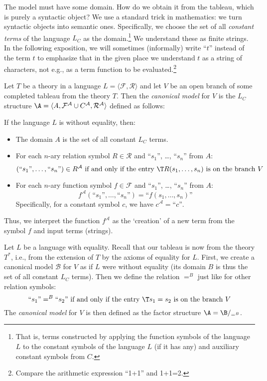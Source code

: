 The model must have some domain. How do we obtain it from the tableau, which is purely a syntactic object? We use a standard trick in mathematics: we turn syntactic objects into semantic ones. Specifically, we choose the set of all \emph{constant terms} of the language $L_C$ as the domain.\footnote{That is, terms constructed by applying the function symbols of the language $L$ to the constant symbols of the language $L$ (if it has any) and auxiliary constant symbols from $C$.} We understand these as finite strings. In the following exposition, we will sometimes (informally) write ``$t$'' instead of the term $t$ to emphasize that in the given place we understand $t$ as a string of characters, not e.g., as a term function to be evaluated.\footnote{Compare the arithmetic expression ``1+1'' and 1+1=2.}

\begin{definition}\label{definition:canonical-model-predicate}
Let $T$ be a theory in a language $L=\langle\mathcal F,\mathcal R\rangle$ and let $V$ be an open branch of some completed tableau from the theory $T$. Then the \emph{canonical model} for $V$ is the $L_C$ structure $\A=\langle A,\mathcal F^\mathcal A\cup C^\mathcal A,\mathcal R^\mathcal A\rangle$ defined as follows:

If the language $L$ is without equality, then:
\begin{itemize}
    \item The domain $A$ is the set of all constant $L_C$ terms.
    \item For each $n$-ary relation symbol $R\in\mathcal R$ and ``$s_1$'', \dots, ``$s_n$'' from $A$:
    $$
    (\text{``$s_1$''},\dots,\text{``$s_n$''})\in R^\mathcal A\text{ if and only if the entry $\T R(s_1,\dots,s_n)$ is on the branch $V$}
    $$
    \item For each $n$-ary function symbol $f\in\mathcal F$ and ``$s_1$'', \dots, ``$s_n$'' from $A$:
    $$
    f^\mathcal A(\text{``$s_1$''},\dots,\text{``$s_n$''})=\text{``$f(s_1,\dots,s_n)$''}
    $$
    Specifically, for a constant symbol $c$, we have $c^\mathcal A=\text{``$c$''}$.
\end{itemize}
Thus, we interpret the function $f^\mathcal A$ as the `creation' of a new term from the symbol $f$ and input terms (strings). 

Let $L$ be a language with equality. Recall that our tableau is now from the theory $T^*$, i.e., from the extension of $T$ by the axioms of equality for $L$. First, we create a canonical model $\mathcal B$ for $V$ as if $L$ were without equality (its domain $B$ is thus the set of all constant $L_C$ terms). Then we define the relation $=^B$ just like for other relation symbols:
$$
\text{``$s_1$''}=^B\text{``$s_2$''}\text{ if and only if the entry $\T s_1=s_2$ is on the branch $V$}
$$
The \emph{canonical model} for $V$ is then defined as the factor structure $\A=\B/_{=^B}$.
\end{definition}

